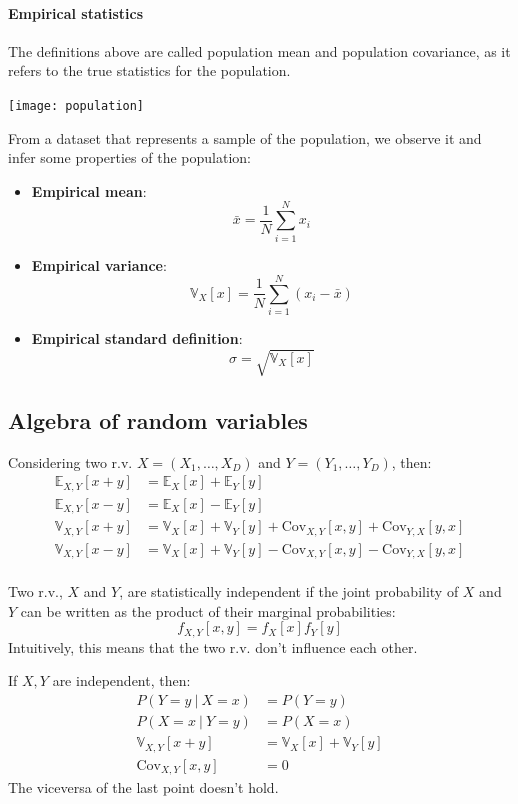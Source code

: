 \documentclass{article}
\begin{document}
\paragraph{Empirical statistics}
The definitions above are called population mean and population covariance, as
it refers to the true statistics for the population.
\begin{center}
    \texttt{[image: population]}
\end{center}
From a dataset that represents a sample of the population, we observe it and
infer some properties of the population:
\begin{itemize}
    \item \textbf{Empirical mean}:
        $$\bar{x}=\frac{1}{N}\displaystyle\sum_{i=1}^{N}x_i$$
    \item \textbf{Empirical variance}:
        $$\mathbb{V}_X[x]=\frac{1}{N}\displaystyle\sum_{i=1}^{N}(x_i-\bar{x})$$
    \item \textbf{Empirical standard definition}: 
        $$\sigma=\sqrt{\mathbb{V}_X[x]}$$
\end{itemize}
\subsection{Algebra of random variables}
Considering two r.v. $X=(X_1,\ldots,X_D)$ and $Y=(Y_1,\ldots,Y_D)$, then:
$$
\begin{aligned}
    \mathbb{E}_{X,Y}[x+y]&=\mathbb{E}_X[x]+\mathbb{E}_Y[y]\\
    \mathbb{E}_{X,Y}[x-y]&=\mathbb{E}_X[x]-\mathbb{E}_Y[y]\\
    \mathbb{V}_{X,Y}[x+y]&=\mathbb{V}_X[x]+\mathbb{V}_Y[y]+\text{Cov}_{X,Y}[x,y]+\text{Cov}_{Y,X}[y,x]\\
    \mathbb{V}_{X,Y}[x-y]&=\mathbb{V}_X[x]+\mathbb{V}_Y[y]-\text{Cov}_{X,Y}[x,y]-\text{Cov}_{Y,X}[y,x]\\
\end{aligned}
$$
\begin{definition}[Independence]
    Two r.v., $X$ and $Y$, are statistically independent if the joint
    probability of $X$ and $Y$ can be written as the product of their marginal
    probabilities:
    $$f_{X,Y}[x,y]=f_X[x]f_Y[y]$$
    Intuitively, this means that the two r.v. don't influence each other.
\end{definition}
If $X,Y$ are independent, then: 
$$
\begin{aligned}
    P(Y=y\ |\ X=x) &= P(Y=y)\\
    P(X=x\ |\ Y=y) &= P(X=x)\\
    \mathbb{V}_{X,Y}[x+y]&=\mathbb{V}_X[x]+\mathbb{V}_Y[y]\\
    \text{Cov}_{X,Y}[x,y] &= 0
\end{aligned}
$$
The viceversa of the last point doesn't hold.
\end{document}
